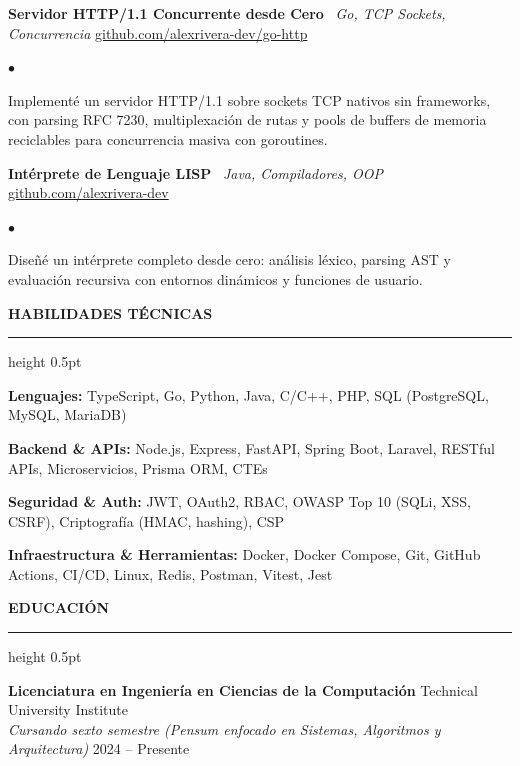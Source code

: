 \documentclass[10pt,letterpaper]{article}
\newcommand{\resumesection}[1]{%
  \vspace{2pt}%
  {\color{primary}\normalsize\bfseries\MakeUppercase{#1}}%
  \vspace{1pt}\hrule height 0.5pt\vspace{2pt}%
}
\renewenvironment{itemize}{%
  \begin{list}{\color{primary}$\bullet$}{%
    \setlength{\leftmargin}{1.1em}%
    \setlength{\itemsep}{0.5pt}%
    \setlength{\topsep}{1pt}%
    \setlength{\parsep}{0pt}%
    \setlength{\partopsep}{0pt}%
  }%
}{%
  \end{list}%
}
\newenvironment{skilllist}{%
  \begin{list}{}{%
    \setlength{\leftmargin}{0pt}%
    \setlength{\itemsep}{0.5pt}%
    \setlength{\topsep}{1pt}%
    \setlength{\parsep}{0pt}%
    \setlength{\partopsep}{0pt}%
  }%
}{%
  \end{list}%
}
\begin{document}
\vspace{1pt}

\textbf{Servidor HTTP/1.1 Concurrente desde Cero} \textbar\ \textit{Go, TCP Sockets, Concurrencia} \hfill \href{https://github.com/alexrivera-dev/go-http}{github.com/alexrivera-dev/go-http}
\begin{itemize}
    \item Implementé un servidor HTTP/1.1 sobre sockets TCP nativos sin frameworks, con parsing RFC 7230, multiplexación de rutas y pools de buffers de memoria reciclables para concurrencia masiva con goroutines.
\end{itemize}

\vspace{1pt}

\textbf{Intérprete de Lenguaje LISP} \textbar\ \textit{Java, Compiladores, OOP} \hfill \href{https://github.com/alexrivera-dev}{github.com/alexrivera-dev}
\begin{itemize}
    \item Diseñé un intérprete completo desde cero: análisis léxico, parsing AST y evaluación recursiva con entornos dinámicos y funciones de usuario.
\end{itemize}

\resumesection{Habilidades Técnicas}
\begin{skilllist}
    \item \textbf{Lenguajes:} TypeScript, Go, Python, Java, C/C++, PHP, SQL (PostgreSQL, MySQL, MariaDB)
    \item \textbf{Backend \& APIs:} Node.js, Express, FastAPI, Spring Boot, Laravel, RESTful APIs, Microservicios, Prisma ORM, CTEs
    \item \textbf{Seguridad \& Auth:} JWT, OAuth2, RBAC, OWASP Top 10 (SQLi, XSS, CSRF), Criptografía (HMAC, hashing), CSP
    \item \textbf{Infraestructura \& Herramientas:} Docker, Docker Compose, Git, GitHub Actions, CI/CD, Linux, Redis, Postman, Vitest, Jest
\end{skilllist}

\resumesection{Educación}
\textbf{Licenciatura en Ingeniería en Ciencias de la Computación} \hfill Technical University Institute \\
\textit{Cursando sexto semestre (Pensum enfocado en Sistemas, Algoritmos y Arquitectura)} \hfill 2024 -- Presente
\end{document}
